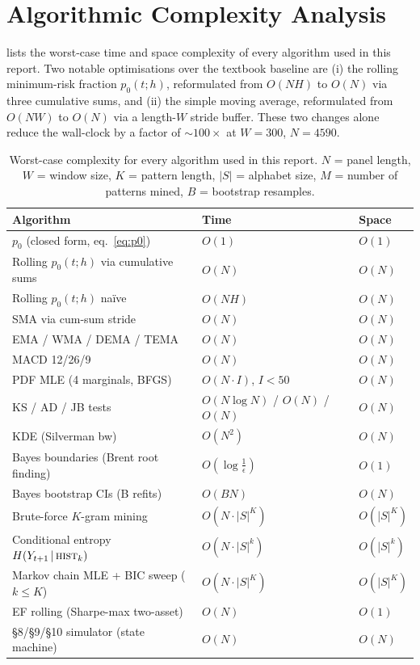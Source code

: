 \documentclass[runningheads]{llncs}
\begin{document}
\section{Algorithmic Complexity Analysis}\label{sec:complexity}
 lists the worst-case time and space complexity
of every algorithm used in this report. Two notable optimisations over
the textbook baseline are (i) the rolling minimum-risk fraction
$p_{0}(t;h)$, reformulated from $O(NH)$ to $O(N)$ via three cumulative
sums, and (ii) the simple moving average, reformulated from $O(NW)$ to
$O(N)$ via a length-$W$ stride buffer. These two changes alone reduce
the wall-clock by a factor of $\sim 100\times$ at $W{=}300$, $N{=}\num{4590}$.
\begin{table}[!htbp]
\centering\small
\caption{Worst-case complexity for every algorithm used in this report.
$N$ = panel length, $W$ = window size, $K$ = pattern length, $|S|$ = alphabet size,
$M$ = number of patterns mined, $B$ = bootstrap resamples.}\label{tab:complexity}
\begin{tabular}{l l l}
\toprule
Algorithm & Time & Space\\\midrule
$p_{0}$ (closed form, eq.~\ref{eq:p0}) & $O(1)$ & $O(1)$\\
Rolling $p_{0}(t;h)$ via cumulative sums & $O(N)$ & $O(N)$\\
Rolling $p_{0}(t;h)$ naïve & $O(NH)$ & $O(N)$\\
SMA via cum-sum stride & $O(N)$ & $O(N)$\\
EMA / WMA / DEMA / TEMA & $O(N)$ & $O(N)$\\
MACD 12/26/9 & $O(N)$ & $O(N)$\\
PDF MLE (4 marginals, BFGS) & $O(N\!\cdot\!I)$, $I{<}50$ & $O(N)$\\
KS / AD / JB tests & $O(N\log N)$ / $O(N)$ / $O(N)$ & $O(N)$\\
KDE (Silverman bw) & $O(N^{2})$ & $O(N)$\\
Bayes boundaries (Brent root finding) & $O(\log\frac{1}{\epsilon})$ & $O(1)$\\
Bayes bootstrap CIs (B refits) & $O(BN)$ & $O(N)$\\
Brute-force $K$-gram mining & $O(N\!\cdot\!|S|^{K})$ & $O(|S|^{K})$\\
Conditional entropy $H(Y_{t+1}\,|\,\textsc{hist}_{k})$ & $O(N\!\cdot\!|S|^{k})$ & $O(|S|^{k})$\\
Markov chain MLE + BIC sweep ($k\!\le\!K$) & $O(N\!\cdot\!|S|^{K})$ & $O(|S|^{K})$\\
EF rolling (Sharpe-max two-asset) & $O(N)$ & $O(1)$\\
\S8/\S9/\S10 simulator (state machine) & $O(N)$ & $O(N)$\\
\bottomrule
\end{tabular}
\end{table}
\end{document}
